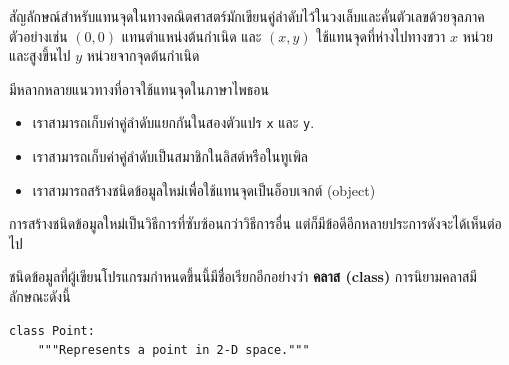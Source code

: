 สัญลักษณ์สำหรับแทนจุดในทางคณิตศาสตร์มักเขียนคู่ลำดับไว้ในวงเล็บและคั่นตัวเลขด้วยจุลภาค ตัวอย่างเช่น
{\scriptsize$(0,0)$} แทนตำแหน่งต้นกำเนิด และ  {\scriptsize$(x,y)$} ใช้แทนจุดที่ห่างไปทางขวา {\scriptsize$x$} หน่วย และสูงขึ้นไป  {\scriptsize$y$} หน่วยจากจุดต้นกำเนิด

มีหลากหลายแนวทางที่อาจใช้แทนจุดในภาษาไพธอน

\begin{itemize}


\item เราสามารถเก็บค่าคู่ลำดับแยกกันในสองตัวแปร {\tt x} และ {\tt y}.


\item เราสามารถเก็บค่าคู่ลำดับเป็นสมาชิกในลิสต์หรือในทูเพิล


\item เราสามารถสร้างชนิดข้อมูลใหม่เพื่อใช้แทนจุดเป็นอ็อบเจกต์ (object)

\end{itemize}



การสร้างชนิดข้อมูลใหม่เป็นวิธีการที่ซับซ้อนกว่าวิธีการอื่น  แต่ก็มีข้อดีอีกหลายประการดังจะได้เห็นต่อไป


ชนิดข้อมูลที่ผู้เขียนโปรแกรมกำหนดขึ้นนี้มีชื่อเรียกอีกอย่างว่า {\bf คลาส (class)}
การนิยามคลาสมีลักษณะดังนี้


\begin{verbatim}
class Point:
    """Represents a point in 2-D space."""
\end{verbatim}
%

